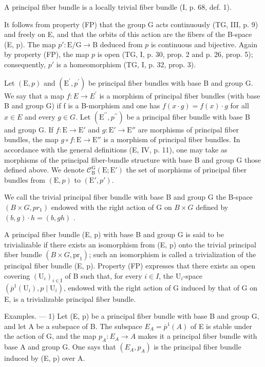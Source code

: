 A principal fiber bundle is a locally trivial fiber bundle (I, p. 68, def. 1).

It follows from property (FP) that the group G acts continuously (TG, III, p. 9) and freely on E, and that the orbits of this action are the fibers of the B-space (E, p). The map \(p' \colon \mathrm{E} / \mathrm{G} \to \mathrm{B}\) deduced from \(p\) is continuous and bijective. Again by property (FP), the map \(p\) is open (TG, I, p. 30, prop. 2 and p. 26, prop. 5); consequently, \(p'\) is a homeomorphism (TG, I, p. 32, prop. 3).

Let \((\mathrm{E},p)\) and \((\mathrm{E}^{\prime},p^{\prime})\) be principal fiber bundles with base B and group G. We say that a map \(f: E \to E^{\prime}\) is a morphism of principal fiber bundles (with base B and group G) if f is a B-morphism and one has \(f(x \cdot g) = f(x) \cdot g\) for all \(x \in E\) and every \(g \in G\). Let \((\mathrm{E}^{\prime\prime},p^{\prime\prime})\) be a principal fiber bundle with base B and group G. If \(f: \mathrm{E} \to \mathrm{E}'\) and \(g: \mathrm{E}' \to \mathrm{E}''\) are morphisms of principal fiber bundles, the map \(g \circ f: \mathrm{E} \to \mathrm{E}''\) is a morphism of principal fiber bundles. In accordance with the general definitions (E, IV, p. 11), one may take as morphisms of the principal fiber-bundle structure with base B and group G those defined above. We denote \(\mathcal{C}_{\mathrm{B}}^{\mathrm{G}}(\mathrm{E}; \mathrm{E}')\) the set of morphisms of principal fiber bundles from \((\mathrm{E}, p)\) to \((\mathrm{E}',p')\).

We call the trivial principal fiber bundle with base B and group G the B-space \((B \times G, pr_{1})\) endowed with the right action of G on \(B \times G\) defined by \((b, g) \cdot h = (b, gh)\) .

A principal fiber bundle (E, p) with base B and group G is said to be trivializable if there exists an isomorphism from (E, p) onto the trivial principal fiber bundle \((B \times G,\mathrm{pr}_{1})\); such an isomorphism is called a trivialization of the principal fiber bundle (E, p). Property (FP) expresses that there exists an open covering \((\mathrm{U}_{i})_{i \in \mathrm{I}}\) of B such that, for every \(i \in I\), the \(\mathrm{U}_{i}\)-space \((\overline{p}^{1}(\mathrm{U}_{i}), p \mid \mathrm{U}_{i})\), endowed with the right action of G induced by that of G on E, is a trivializable principal fiber bundle.

Examples. --- 1) Let (E, p) be a principal fiber bundle with base B and group G, and let A be a subspace of B. The subspace \(E_{A} = \overline{p}^{1}(A)\) of E is stable under the action of G, and the map \(p_{A}: E_{A} \to A\) makes it a principal fiber bundle with base A and group G. One says that \((E_{A}, p_{A})\) is the principal fiber bundle induced by (E, p) over A.

